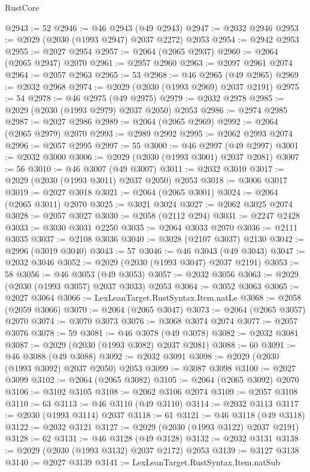 \begin{lexlean}{RustCore}
\begin{coremodule}
@2943 := 52
@2946 := @46 @2943 (@49 @2943)
@2947 := @2032 @2946
@2953 := @2029 (@2030 (@1993 @2947) @2037 @2272) @2053
@2954 := @2942 @2953
@2955 := @2027 @2954
@2957 := @2064 (@2065 @2937)
@2960 := @2064 (@2065 @2947) @2070
@2961 := @2957 @2960
@2963 := @2097 @2961 @2074
@2964 := @2057 @2963
@2965 := 53
@2968 := @46 @2965 (@49 @2965)
@2969 := @2032 @2968
@2974 := @2029 (@2030 (@1993 @2969) @2037 @2191)
@2975 := 54
@2978 := @46 @2975 (@49 @2975)
@2979 := @2032 @2978
@2985 := @2029 (@2030 (@1993 @2979) @2037 @2050) @2053
@2986 := @2974 @2985
@2987 := @2027 @2986
@2989 := @2064 (@2065 @2969)
@2992 := @2064 (@2065 @2979) @2070
@2993 := @2989 @2992
@2995 := @2062 @2993 @2074
@2996 := @2057 @2995
@2997 := 55
@3000 := @46 @2997 (@49 @2997)
@3001 := @2032 @3000
@3006 := @2029 (@2030 (@1993 @3001) @2037 @2081)
@3007 := 56
@3010 := @46 @3007 (@49 @3007)
@3011 := @2032 @3010
@3017 := @2029 (@2030 (@1993 @3011) @2037 @2050) @2053
@3018 := @3006 @3017
@3019 := @2027 @3018
@3021 := @2064 (@2065 @3001)
@3024 := @2064 (@2065 @3011) @2070
@3025 := @3021 @3024
@3027 := @2062 @3025 @2074
@3028 := @2057 @3027
@3030 := @2058 (@2112 @294)
@3031 := @2247 @2428
@3033 := @3030 @3031 @2250
@3035 := @2064 @3033 @2070
@3036 := @2111 @3035
@3037 := @2108 @3036
@3040 := @3028 (@2107 @3037) @2130
@3042 := @2996 (@3019 @3040)
@3043 := 57
@3046 := @46 @3043 (@49 @3043)
@3047 := @2032 @3046
@3052 := @2029 (@2030 (@1993 @3047) @2037 @2191)
@3053 := 58
@3056 := @46 @3053 (@49 @3053)
@3057 := @2032 @3056
@3063 := @2029 (@2030 (@1993 @3057) @2037 @3033) @2053
@3064 := @3052 @3063
@3065 := @2027 @3064
@3066 := LexLeanTarget.RustSyntax.Item.natLe
@3068 := @2058 (@2059 @3066)
@3070 := @2064 (@2065 @3047)
@3073 := @2064 (@2065 @3057) @2070
@3074 := @3070 @3073
@3076 := @3068 @3074 @2074
@3077 := @2057 @3076
@3078 := 59
@3081 := @46 @3078 (@49 @3078)
@3082 := @2032 @3081
@3087 := @2029 (@2030 (@1993 @3082) @2037 @2081)
@3088 := 60
@3091 := @46 @3088 (@49 @3088)
@3092 := @2032 @3091
@3098 := @2029 (@2030 (@1993 @3092) @2037 @2050) @2053
@3099 := @3087 @3098
@3100 := @2027 @3099
@3102 := @2064 (@2065 @3082)
@3105 := @2064 (@2065 @3092) @2070
@3106 := @3102 @3105
@3108 := @2062 @3106 @2074
@3109 := @2057 @3108
@3110 := 63
@3113 := @46 @3110 (@49 @3110)
@3114 := @2032 @3113
@3117 := @2030 (@1993 @3114) @2037
@3118 := 61
@3121 := @46 @3118 (@49 @3118)
@3122 := @2032 @3121
@3127 := @2029 (@2030 (@1993 @3122) @2037 @2191)
@3128 := 62
@3131 := @46 @3128 (@49 @3128)
@3132 := @2032 @3131
@3138 := @2029 (@2030 (@1993 @3132) @2037 @2172) @2053
@3139 := @3127 @3138
@3140 := @2027 @3139
@3141 := LexLeanTarget.RustSyntax.Item.natSub

\end{coremodule}
\end{lexlean}
